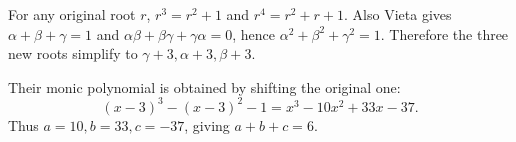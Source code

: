 For any original root $r$, $r^3=r^2+1$ and $r^4=r^2+r+1$. Also Vieta gives $\alpha+\beta+\gamma=1$ and $\alpha\beta+\beta\gamma+\gamma\alpha=0$, hence $\alpha^2+\beta^2+\gamma^2=1$. Therefore the three new roots simplify to $\gamma+3,\alpha+3,\beta+3$.

Their monic polynomial is obtained by shifting the original one:
\[
(x-3)^3-(x-3)^2-1=x^3-10x^2+33x-37.
\]
Thus $a=10,b=33,c=-37$, giving $\boxed{a+b+c=6}$.
